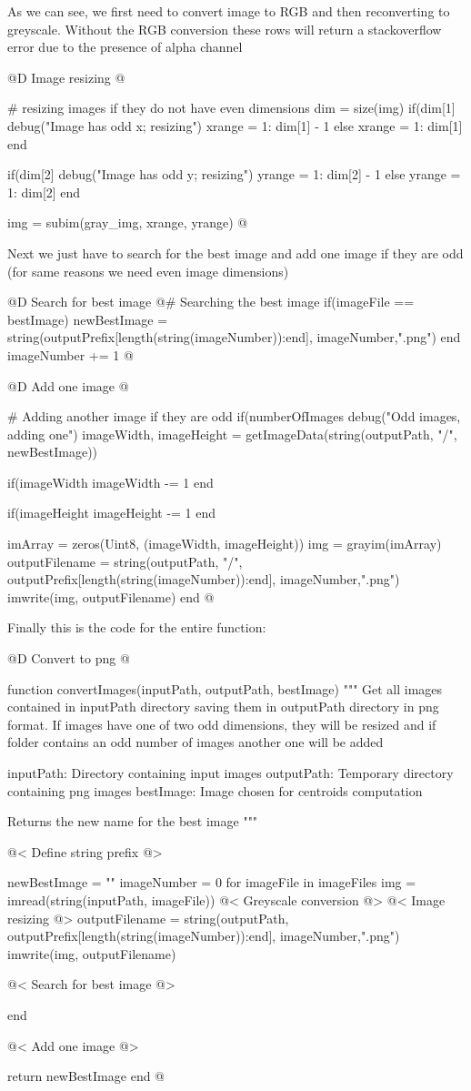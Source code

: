 \documentclass[11pt,oneside]{article}	%
\begin{document}
As we can see, we first need to convert image to RGB and then reconverting to greyscale. Without the RGB conversion these rows will return a stackoverflow error due to the presence of alpha channel


@D Image resizing
@{# resizing images if they do not have even dimensions
dim = size(img)
if(dim[1] %
  debug("Image has odd x; resizing")
  xrange = 1: dim[1] - 1
else
  xrange = 1: dim[1]
end

if(dim[2] %
  debug("Image has odd y; resizing")
  yrange = 1: dim[2] - 1
else
  yrange = 1: dim[2]
end

img = subim(gray_img, xrange, yrange) @}
    

Next we just have to search for the best image and add one image if they are odd (for same reasons we need even image dimensions)

@D Search for best image
@{# Searching the best image
if(imageFile == bestImage)
  newBestImage = string(outputPrefix[length(string(imageNumber)):end],
			    imageNumber,".png")
end
imageNumber += 1 @}
    
@D Add one image
@{# Adding another image if they are odd
if(numberOfImages %
  debug("Odd images, adding one")  
  imageWidth, imageHeight = getImageData(string(outputPath, "/", newBestImage))
  
  if(imageWidth %
    imageWidth -= 1
  end
  
  if(imageHeight %
    imageHeight -= 1
  end  
  
  imArray = zeros(Uint8, (imageWidth, imageHeight))
  img = grayim(imArray)
  outputFilename = string(outputPath, "/", 
		      outputPrefix[length(string(imageNumber)):end], imageNumber,".png")
  imwrite(img, outputFilename)
end @}

Finally this is the code for the entire function:

@D Convert to png
@{function convertImages(inputPath, outputPath, bestImage)
  """
  Get all images contained in inputPath directory
  saving them in outputPath directory in png format.
  If images have one of two odd dimensions, they will be resized
  and if folder contains an odd number of images another one will be
  added

  inputPath: Directory containing input images
  outputPath: Temporary directory containing png images
  bestImage: Image chosen for centroids computation

  Returns the new name for the best image
  """

  @< Define string prefix @>
  
  newBestImage = ""
  imageNumber = 0
  for imageFile in imageFiles
    img = imread(string(inputPath, imageFile))
    @< Greyscale conversion @>
    @< Image resizing @>
    outputFilename = string(outputPath, outputPrefix[length(string(imageNumber)):end],
			      imageNumber,".png")
    imwrite(img, outputFilename)

    @< Search for best image @>

  end

  @< Add one image @>

  return newBestImage
end
@}
\end{document}
